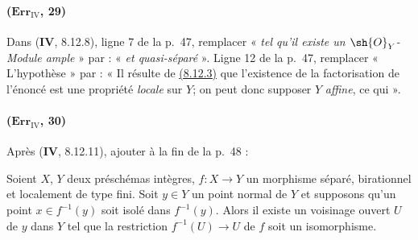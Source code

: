 \paragraph{($\mathbf{Err}_{\mathrm{IV}}$, 29)}
Dans (\textbf{IV}, 8.12.8), ligne 7 de la p.~47, remplacer « \emph{tel qu'il existe un
$\sh{O}_Y$-Module ample} » par : « \emph{et quasi-séparé} ». Ligne 12 de la
p.~47, remplacer « L'hypothèse » par : « Il résulte de
{\hyperref[canon-index.ega4.c04.prop.8-12-3]{(8.12.3)}} que l'existence de la
factorisation de l'énoncé est une propriété \emph{locale} sur $Y$; on peut
donc supposer $Y$ \emph{affine}, ce qui ».

\paragraph{($\mathbf{Err}_{\mathrm{IV}}$, 30)}
Après (\textbf{IV}, 8.12.11), ajouter à la fin de la p.~48 :

\begin{corollary}[8.12.12]
Soient $X$, $Y$ deux préschémas intègres,
$f:X\to Y$ un morphisme séparé, birationnel et localement de type fini.
Soit $y\in Y$ un point normal de $Y$ et supposons qu'un point
$x\in f^{-1}(y)$ soit isolé dans $f^{-1}(y)$. Alors il existe un
voisinage ouvert $U$ de $y$ dans $Y$ tel que la restriction
$f^{-1}(U)\to U$ de $f$ soit un isomorphisme.
\end{corollary}

